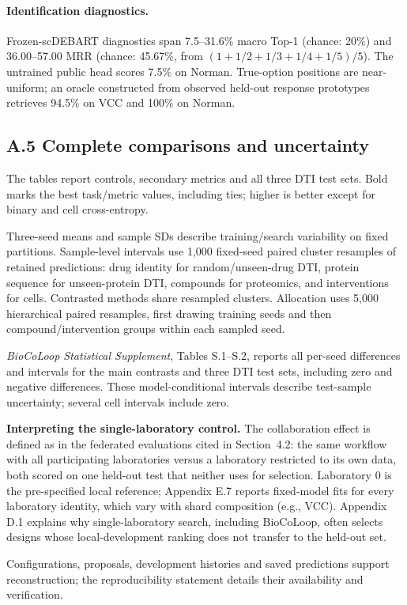 \paragraph{Identification diagnostics.}
Frozen-scDEBART diagnostics span 7.5--31.6\% macro Top-1 (chance: 20\%) and 36.00--57.00 MRR (chance: 45.67\%, from $(1+1/2+1/3+1/4+1/5)/5$). The untrained public head scores 7.5\% on Norman. True-option positions are near-uniform; an oracle constructed from observed held-out response prototypes retrieves 94.5\% on VCC and 100\% on Norman.

\subsection*{A.5 Complete comparisons and uncertainty}
The tables report controls, secondary metrics and all three DTI test sets. Bold marks the best task/metric values, including ties; higher is better except for binary and cell cross-entropy.

Three-seed means and sample SDs describe training/search variability on fixed partitions. Sample-level intervals use 1,000 fixed-seed paired cluster resamples of retained predictions: drug identity for random/unseen-drug DTI, protein sequence for unseen-protein DTI, compounds for proteomics, and interventions for cells. Contrasted methods share resampled clusters. Allocation uses 5,000 hierarchical paired resamples, first drawing training seeds and then compound/intervention groups within each sampled seed.

\emph{BioCoLoop Statistical Supplement}, Tables S.1--S.2, reports all per-seed differences and intervals for the main contrasts and three DTI test sets, including zero and negative differences. These model-conditional intervals describe test-sample uncertainty; several cell intervals include zero.

\textbf{Interpreting the single-laboratory control.} The collaboration effect is defined as in the federated evaluations cited in Section~4.2: the same workflow with all participating laboratories versus a laboratory restricted to its own data, both scored on one held-out test that neither uses for selection. Laboratory 0 is the pre-specified local reference; Appendix E.7 reports fixed-model fits for every laboratory identity, which vary with shard composition (e.g., VCC). Appendix D.1 explains why single-laboratory search, including BioCoLoop, often selects designs whose local-development ranking does not transfer to the held-out set.

Configurations, proposals, development histories and saved predictions support reconstruction; the reproducibility statement details their availability and verification.




